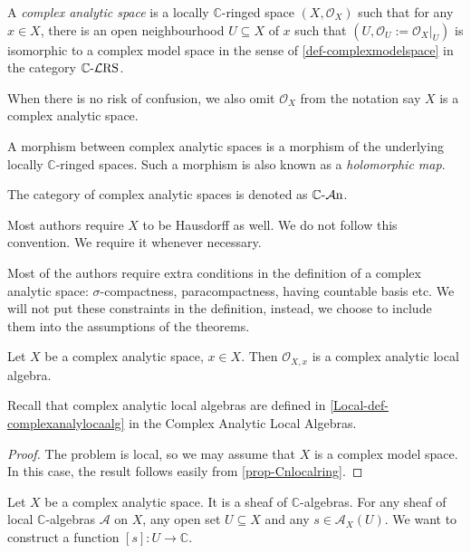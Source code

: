 \begin{definition}\label{def-complexanalyticspace}
    A \emph{complex analytic space} is a locally $\mathbb{C}$-ringed space $(X,\mathcal{O}_X)$ such that 
    for any $x\in X$, there is an open neighbourhood $U\subseteq X$ of $x$ such that $(U,\mathcal{O}_U:=\mathcal{O}_X|_U)$ is isomorphic to a complex model space in the sense of \cref{def-complexmodelspace} in the category $\mathbb{C}\text{-}\mathcal{L}\mathrm{RS}$.
    
    When there is no risk of confusion, we also omit $\mathcal{O}_X$ from the notation say $X$ is a complex analytic space.

    A morphism between complex analytic spaces is a morphism of the underlying locally $\mathbb{C}$-ringed spaces. Such a morphism is also known as a \emph{holomorphic map}.

    The category of complex analytic spaces is denoted as $\mathbb{C}\text{-}\mathcal{A}\mathrm{n}$.
\end{definition}
\begin{remark}
    Most authors require $X$ to be Hausdorff as well. We do not follow this convention. We require it whenever necessary.
\end{remark}
\begin{remark}
    Most of the authors require extra conditions in the definition of a complex analytic space: $\sigma$-compactness, paracompactness, having countable basis etc. We will not put these constraints in the definition, instead, we choose to include them into the assumptions of the theorems.
\end{remark}

\begin{proposition}
    Let $X$ be a complex analytic space, $x\in X$. Then $\mathcal{O}_{X,x}$ is a complex analytic local algebra.
\end{proposition}
Recall that complex analytic local algebras are defined in \cref{Local-def-complexanalylocaalg} in the Complex Analytic Local Algebras.

\begin{proof}
    The problem is local, so we may assume that $X$ is a complex model space. In this case, the result follows easily from \cref{prop-Cnlocalring}.
\end{proof}

Let $X$ be a complex analytic space. It is a sheaf of $\mathbb{C}$-algebras.
For any sheaf of local $\mathbb{C}$-algebras $\mathcal{A}$ on $X$, any open set $U\subseteq X$ and any $s\in \mathcal{A}_X(U)$. We want to construct a function $[s]:U\rightarrow \mathbb{C}$. 

